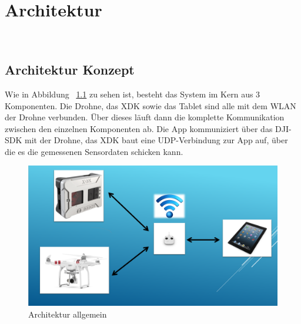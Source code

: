 
\chapter{Architektur}\label{cha:Architektur}
~\cite{mvc1}
\section{Architektur Konzept}\label{sec:Architektur Konzept}
Wie in Abbildung ~\ref{fig:Architektur_grob} zu sehen ist, besteht das System im Kern aus 3 Komponenten. Die Drohne, das \acs{XDK} sowie das Tablet sind alle mit dem \acs{WLAN} der Drohne verbunden. Über dieses läuft dann die komplette Kommunikation zwischen den einzelnen Komponenten ab. Die App kommuniziert über das \acs{DJI}-\acs{SDK} mit der Drohne, das \acs{XDK} baut eine UDP-Verbindung zur App auf, über die es die gemessenen Sensordaten schicken kann.
\begin{figure}[H]
	\includegraphics[width=\textwidth]{images/Architektur_grob.png}	
	\caption{Architektur allgemein}
	\label{fig:Architektur_grob}
\end{figure}

